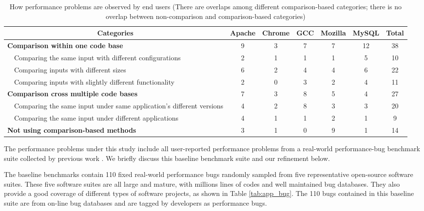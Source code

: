 \begin{table*}[tb!]
\begin{adjustwidth}{-.5in}{-.5in}
\small
\centering
{
\begin{tabular}{|l|c|c|c|c|c|c|}
\hline
\multicolumn{1}{|c|}{Categories} &Apache&Chrome&GCC&Mozilla&MySQL&Total\\
\hline
\multicolumn{1}{|l|}{\textbf{Comparison within one code base}}
&9&3&7&7&12&38\\
\ \ Comparing the same input with different configurations &2&1&1&1&5&10\\
\ \ Comparing inputs with different sizes&6&2&4&4&6&22\\
\ \ Comparing inputs with slightly different functionality&2&0&3&2&4&11\\
\hline
\multicolumn{1}{|l|}{\textbf{Comparison cross multiple code bases}}
&7&3&8&5&4&27\\
\ \ Comparing the same input under same application's different versions
&4&2&8&3&3&20\\
\ \ Comparing the same input under different applications
&4&1&1&2&1&9\\
\hline
\multicolumn{1}{|l|}{\textbf{Not using comparison-based methods}}
&3&1&0&9&1&14\\
\hline
\end{tabular}
}
\end{adjustwidth}
\caption{How performance problems are observed by end users (There are overlaps among
    different comparison-based categories; there is no overlap between non-comparison
    and comparison-based categories)}
\label{tab:cmp}
\end{table*}

The performance problems under this study include all user-reported
performance problems from a real-world performance-bug benchmark suite 
collected by 
previous work \citep{PerfBug}. We briefly discuss this baseline benchmark
suite and our refinement below.

The baseline benchmarks \citep{PerfBug} contain 110 fixed real-world performance
bugs randomly sampled from five representative open-source software suites.
These five software suites are all large and mature,
with millions lines of codes and well maintained bug databases. 
They also provide a good coverage of different types of software projects, as
shown in Table \ref{tab:app_bug}.
The 110 bugs contained in this baseline suite are from
on-line bug databases and are tagged by developers as performance
bugs.

